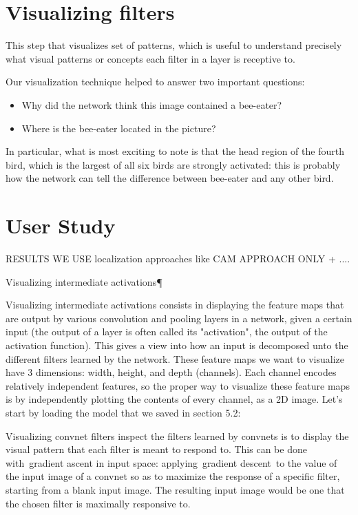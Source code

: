 \section*{Visualizing filters}

This step that visualizes set of patterns, which is useful to understand precisely what visual patterns or concepts each filter in a layer is receptive to.
\fi

Our visualization technique helped to answer two important questions:

\begin{itemize}
\item  Why did the network think this image contained a bee-eater?
\item Where is the bee-eater located in the picture?
\end{itemize}

In particular, what is most exciting to note is that the head region of the fourth bird, which is the largest of all six birds are strongly activated: this is probably how the network can tell the difference between bee-eater and any other bird.

\section{User Study}

\iffalse
RESULTS
WE USE localization approaches like CAM APPROACH ONLY + ....

Visualizing intermediate activations¶

Visualizing intermediate activations consists in displaying the feature maps that are output by various convolution and pooling layers in a network, given a certain input (the output of a layer is often called its "activation", the output of the activation function). This gives a view into how an input is decomposed unto the different filters learned by the network. These feature maps we want to visualize have 3 dimensions: width, height, and depth (channels). Each channel encodes relatively independent features, so the proper way to visualize these feature maps is by independently plotting the contents of every channel, as a 2D image. Let's start by loading the model that we saved in section 5.2:

Visualizing convnet filters
inspect the filters learned by convnets is to display the visual pattern that each filter is meant to respond to. This can be done with gradient ascent in input space: applying gradient descent to the value of the input image of a convnet so as to maximize the response of a specific filter, starting from a blank input image. The resulting input image would be one that the chosen filter is maximally responsive to.

